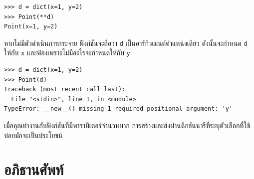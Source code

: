 \begin{verbatim}
>>> d = dict(x=1, y=2)
>>> Point(**d)
Point(x=1, y=2)
\end{verbatim}
%
หากไม่มีตัวดำเนินการกระจาย ฟังก์ชันจะถือว่า {\tt d} เป็นอาร์กิวเมนต์ตำแหน่งเดียว ดังนั้นจะกำหนด {\tt d} ให้กับ {\tt x} และฟ้องเพราะไม่มีอะไรจะกำหนดให้กับ {\tt y}

\begin{verbatim}
>>> d = dict(x=1, y=2)
>>> Point(d)
Traceback (most recent call last):
  File "<stdin>", line 1, in <module>
TypeError: __new__() missing 1 required positional argument: 'y'
\end{verbatim}
%
เมื่อคุณทำงานกับฟังก์ชันที่มีพารามิเตอร์จำนวนมาก การสร้างและส่งผ่านดิกชันนารีที่ระบุตัวเลือกที่ใช้บ่อยมักจะเป็นประโยชน์


\section{อภิธานศัพท์}


